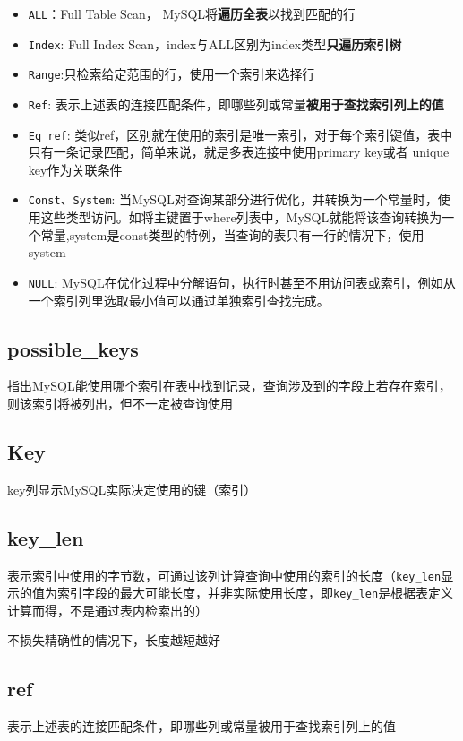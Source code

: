 \documentclass[UTF8,a4paper,12pt]{ctexbook}
\begin{document}
			\begin{itemize}
				\item \verb|ALL|：Full Table Scan， MySQL将\textbf{遍历全表}以找到匹配的行
				\item \verb|Index|: Full Index Scan，index与ALL区别为index类型\textbf{只遍历索引树}
				\item \verb|Range|:只检索给定范围的行，使用一个索引来选择行
				\item \verb|Ref|: 表示上述表的连接匹配条件，即哪些列或常量\textbf{被用于查找索引列上的值}
				\item \verb|Eq_ref|: 	类似ref，区别就在使用的索引是唯一索引，对于每个索引键值，表中只有一条记录匹配，简单来说，就是多表连接中使用primary key或者 unique key作为关联条件
				\item \verb|Const|、\verb|System|: 当MySQL对查询某部分进行优化，并转换为一个常量时，使用这些类型访问。如将主键置于where列表中，MySQL就能将该查询转换为一个常量,system是const类型的特例，当查询的表只有一行的情况下，使用system
				\item \verb|NULL|: MySQL在优化过程中分解语句，执行时甚至不用访问表或索引，例如从一个索引列里选取最小值可以通过单独索引查找完成。
			\end{itemize}
			
		\subsection{possible\_keys}
			指出MySQL能使用哪个索引在表中找到记录，查询涉及到的字段上若存在索引，则该索引将被列出，但不一定被查询使用
			
		\subsection{Key}
			key列显示MySQL实际决定使用的键（索引）
			
		\subsection{key\_len}
			表示索引中使用的字节数，可通过该列计算查询中使用的索引的长度（\verb|key_len|显示的值为索引字段的最大可能长度，并非实际使用长度，即\verb|key_len|是根据表定义计算而得，不是通过表内检索出的）
			
			不损失精确性的情况下，长度越短越好 
			
		\subsection{ref}
			表示上述表的连接匹配条件，即哪些列或常量被用于查找索引列上的值
			
\end{document}

